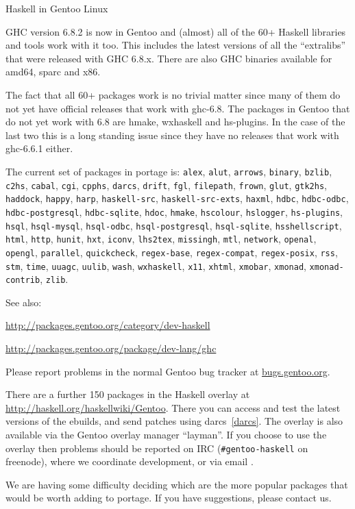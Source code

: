 \begin{hcarentry}[updated]{Haskell in Gentoo Linux}
\label{gentoo}
\makeheader

GHC version 6.8.2 is now in Gentoo and (almost) all of the 60+ Haskell
libraries and tools work with it too. This includes the latest versions
of all the ``extralibs'' that were released with GHC 6.8.x. There are also
GHC binaries available for amd64, sparc and x86.

The fact that all 60+ packages work is no trivial matter since many of
them do not yet have official releases that work with ghc-6.8. The
packages in Gentoo that do not yet work with 6.8 are hmake, wxhaskell
and hs-plugins. In the case of the last two this is a long standing
issue since they have no releases that work with ghc-6.6.1 either.

The current set of packages in portage is:
{%
\texttt{alex},
\texttt{alut},
\texttt{arrows},
\texttt{binary},
\texttt{bzlib},
\texttt{c2hs},
\texttt{cabal},
\texttt{cgi},
\texttt{cpphs},
\texttt{darcs},
\texttt{drift},
\texttt{fgl},
\texttt{filepath},
\texttt{frown},
\texttt{glut},
\texttt{gtk2hs},
\texttt{haddock},
\texttt{happy},
\texttt{harp},
\texttt{haskell-src},
\texttt{haskell-src-exts},
\texttt{haxml},
\texttt{hdbc},
\texttt{hdbc-odbc},
\texttt{hdbc-postgresql},
\texttt{hdbc-sqlite},
\texttt{hdoc},
\texttt{hmake},
\texttt{hscolour},
\texttt{hslogger},
\texttt{hs-plugins},
\texttt{hsql},
\texttt{hsql-mysql},
\texttt{hsql-odbc},
\texttt{hsql-postgresql},
\texttt{hsql-sqlite},
\texttt{hsshellscript},
\texttt{html},
\texttt{http},
\texttt{hunit},
\texttt{hxt},
\texttt{iconv},
\texttt{lhs2tex},
\texttt{missingh},
\texttt{mtl},
\texttt{network},
\texttt{openal},
\texttt{opengl},
\texttt{parallel},
\texttt{quickcheck},
\texttt{regex-base},
\texttt{regex-compat},
\texttt{regex-posix},
\texttt{rss},
\texttt{stm},
\texttt{time},
\texttt{uuagc},
\texttt{uulib},
\texttt{wash},
\texttt{wxhaskell},
\texttt{x11},
\texttt{xhtml},
\texttt{xmobar},
\texttt{xmonad},
\texttt{xmonad-contrib},
\texttt{zlib}}.

See also:
\begin{compactitem}
\item \url{http://packages.gentoo.org/category/dev-haskell}
\item \url{http://packages.gentoo.org/package/dev-lang/ghc}
\end{compactitem}

Please report problems in the normal Gentoo bug tracker
at \url{bugs.gentoo.org}.

There are a further 150 packages in the Haskell overlay at
\url{http://haskell.org/haskellwiki/Gentoo}. There you can
access and test the latest versions of the ebuilds, and
send patches using darcs~\cref{darcs}. The overlay is
also available via the Gentoo overlay manager ``layman''.
If you choose to use the overlay then problems should be
reported on
IRC (\verb+#gentoo-haskell+ on freenode), where we coordinate
development, or via email .

We are having some difficulty deciding which are the more
popular packages that would be worth adding to portage. If you
have suggestions, please contact us.
\end{hcarentry}

